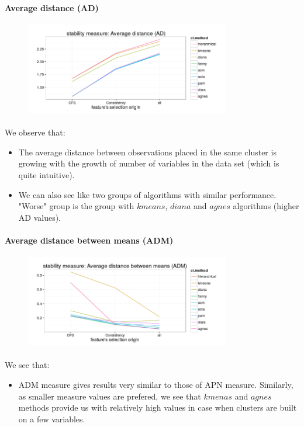\documentclass[10pt]{article}\usepackage[]{graphicx}\usepackage[]{color}
\begin{document}
\paragraph{Average distance (AD)} 
\begin{figure}[h!]
\centering
\includegraphics[width=0.8\textwidth]{Plots2/comp1-ad.png}
\end{figure}
\paragraph{} 
We observe that:
\begin{itemize}
\item The average distance between observations placed in the same
cluster is growing with the growth of number of variables in the data set (which is quite intuitive). 
\item We can also see like two groups of algorithms with similar performance. "Worse" group is the group with $kmeans$, $diana$ and $agnes$ algorithms (higher AD values).
\end{itemize}

\paragraph{Average distance between means (ADM)} 
\begin{figure}[h!]
\centering
\includegraphics[width=0.8\textwidth]{Plots2/comp1-adm.png}
\end{figure}
\paragraph{} 
We see that:
\begin{itemize}
\item ADM measure gives results very similar to those of APN measure. Similarly, as 
smaller measure values are prefered, we see that  $kmenas$ and $agnes$ methods provide us with relatively high values in case when clusters are built on a few variables.
\end{itemize}
\end{document}
